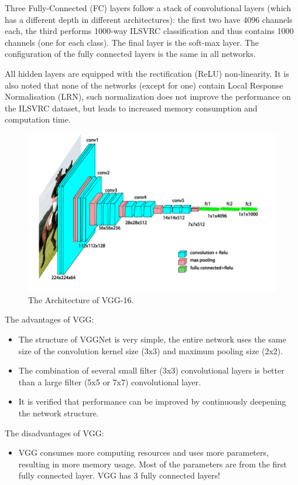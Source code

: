 Three Fully-Connected (FC) layers follow a stack of convolutional layers (which has a different depth in different architectures): the first two have 4096 channels each, the third performs 1000-way ILSVRC classification and thus contains 1000 channels (one for each class). The final layer is the soft-max layer. The configuration of the fully connected layers is the same in all networks.

All hidden layers are equipped with the rectification (ReLU) non-linearity. It is also noted that none of the networks (except for one) contain Local Response Normalisation (LRN), such normalization does not improve the performance on the ILSVRC dataset, but leads to increased memory consumption and computation time.


\begin{figure}[!htbp]
	\centering
	\includegraphics[width=0.8\linewidth]{figures/vgg16}
	\caption[The Architecture of VGG-16]{The Architecture of VGG-16.}
	\label{fig:vgg16}
\end{figure}

The advantages of VGG:
\begin{itemize}
	\item The structure of VGGNet is very simple, the entire network uses the same size of the convolution kernel size (3x3) and maximum pooling size (2x2).
	\item The combination of several small filter (3x3) convolutional layers is better than a large filter (5x5 or 7x7) convolutional layer.
	\item It is verified that performance can be improved by continuously deepening the network structure.
\end{itemize}

The disadvantages of VGG:

\begin{itemize}
	\item VGG consumes more computing resources and uses more parameters, resulting in more memory usage. Most of the parameters are from the first fully connected layer. VGG has 3 fully connected layers!
\end{itemize}



